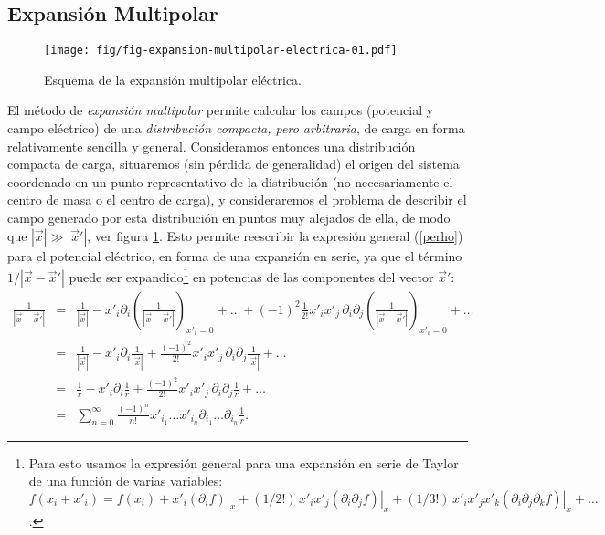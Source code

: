 \subsection{Expansión Multipolar}
\begin{figure}[!h]
\centerline{\texttt{[image: fig/fig-expansion-multipolar-electrica-01.pdf]}}
\caption{Esquema de la expansión multipolar eléctrica.}
\label{fig:emc}
\end{figure}
El método de {\em expansión multipolar} permite calcular los campos (potencial y campo eléctrico) de una
\textit{distribución compacta, pero arbitraria}, de carga en forma relativamente sencilla y general. Consideramos entonces una distribución compacta de carga, situaremos (sin pérdida de generalidad) el origen del sistema coordenado en un punto representativo de la distribución (no necesariamente el centro de masa o el centro de carga), y consideraremos el problema de describir el
campo generado por esta distribución en puntos muy alejados de ella, de modo
que $|\vec{x}|\gg|\vec{x}'|$, ver figura \ref{fig:emc}. Esto permite
reescribir la expresión general (\ref{perho}) para el potencial
eléctrico, en forma de una expansión en serie, ya
que el término $1/\left|\vec{x}-\vec{x}'\right|$ puede ser expandido\footnote{Para esto usamos la expresión general para una expansión en serie de Taylor de una función de varias variables: $f(x_i+x'_i)=f(x_i)+x'_i\left.(\partial_if)\right|_x+(1/2!)\,x'_ix'_j\left.(\partial_i\partial_jf)\right|_x +(1/3!)\,x'_ix'_jx'_k\left.(\partial_i\partial_j\partial_kf)\right|_x+\dots$.}
en potencias de las componentes del vector $\vec{x}'$:
\begin{eqnarray}
\frac{1}{\left|\vec{x}-\vec{x}'\right|}
&=&\frac{1}{\left|\vec{x}\right|}
-x'_i\partial_i\left(\frac{1}{\left|\vec{x}-\vec{x}'\right|} \right)
_{x'_i=0}+\dots+(-1)^2\frac{1}{2!}x'_ix'_j\,
\partial_i\partial_j\left(\frac{1} { \left|\vec{x}-\vec{x}
'\right|} \right) _{x'_i=0}+\dots \\
&=&\frac{1}{\left|\vec{x}\right|}-x'_i\partial_i\frac{1}{\left|\vec{x}\right|}
 +\frac{(-1)^2}{2!}x'_ix'_j\,\partial_i\partial_j\frac{1}{\left|\vec{x}\right|}
+\dots \\
&=&\frac{1}{r}-x'_i\partial_i\frac{1}{r}+\frac{(-1)^2}{2!}x'_ix'_j\,
\partial_i\partial_j\frac{1}{r} +\dots \\
&=&\sum_{n=0}^\infty\frac{(-1)^n}{n!}x'_{i_1}\dots x'_{i_n}\partial_{i_1}\dots
\partial_{i_n}\frac{1}{r} .\label{exp1or}
\end{eqnarray}
